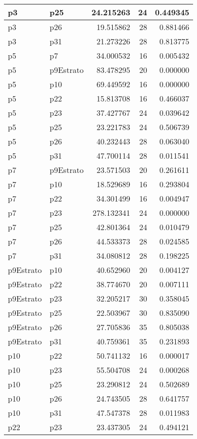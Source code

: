\begin{table}
\begin{tabular}[t]{l|l|r|r|r}
\hline
p3 & p25 & 24.215263 & 24 & 0.449345\\
\hline
p3 & p26 & 19.515862 & 28 & 0.881466\\
\hline
p3 & p31 & 21.273226 & 28 & 0.813775\\
\hline
p5 & p7 & 34.000532 & 16 & 0.005432\\
\hline
p5 & p9Estrato & 83.478295 & 20 & 0.000000\\
\hline
p5 & p10 & 69.449592 & 16 & 0.000000\\
\hline
p5 & p22 & 15.813708 & 16 & 0.466037\\
\hline
p5 & p23 & 37.427767 & 24 & 0.039642\\
\hline
p5 & p25 & 23.221783 & 24 & 0.506739\\
\hline
p5 & p26 & 40.232443 & 28 & 0.063040\\
\hline
p5 & p31 & 47.700114 & 28 & 0.011541\\
\hline
p7 & p9Estrato & 23.571503 & 20 & 0.261611\\
\hline
p7 & p10 & 18.529689 & 16 & 0.293804\\
\hline
p7 & p22 & 34.301499 & 16 & 0.004947\\
\hline
p7 & p23 & 278.132341 & 24 & 0.000000\\
\hline
p7 & p25 & 42.801364 & 24 & 0.010479\\
\hline
p7 & p26 & 44.533373 & 28 & 0.024585\\
\hline
p7 & p31 & 34.080812 & 28 & 0.198225\\
\hline
p9Estrato & p10 & 40.652960 & 20 & 0.004127\\
\hline
p9Estrato & p22 & 38.774670 & 20 & 0.007111\\
\hline
p9Estrato & p23 & 32.205217 & 30 & 0.358045\\
\hline
p9Estrato & p25 & 22.503967 & 30 & 0.835090\\
\hline
p9Estrato & p26 & 27.705836 & 35 & 0.805038\\
\hline
p9Estrato & p31 & 40.759361 & 35 & 0.231893\\
\hline
p10 & p22 & 50.741132 & 16 & 0.000017\\
\hline
p10 & p23 & 55.504708 & 24 & 0.000268\\
\hline
p10 & p25 & 23.290812 & 24 & 0.502689\\
\hline
p10 & p26 & 24.743505 & 28 & 0.641757\\
\hline
p10 & p31 & 47.547378 & 28 & 0.011983\\
\hline
p22 & p23 & 23.437305 & 24 & 0.494121\\

\end{tabular}
\end{table}
